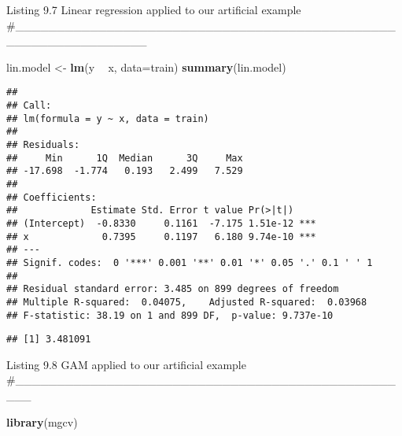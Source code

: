 \documentclass[]{article}
\newenvironment{Shaded}{\begin{snugshade}}{\end{snugshade}}
\newcommand{\CommentTok}[1]{\textcolor[rgb]{0.56,0.35,0.01}{\textit{#1}}}
\newcommand{\DataTypeTok}[1]{\textcolor[rgb]{0.13,0.29,0.53}{#1}}
\newcommand{\DecValTok}[1]{\textcolor[rgb]{0.00,0.00,0.81}{#1}}
\newcommand{\KeywordTok}[1]{\textcolor[rgb]{0.13,0.29,0.53}{\textbf{#1}}}
\newcommand{\NormalTok}[1]{#1}
\newcommand{\OperatorTok}[1]{\textcolor[rgb]{0.81,0.36,0.00}{\textbf{#1}}}
\newcommand{\StringTok}[1]{\textcolor[rgb]{0.31,0.60,0.02}{#1}}
\begin{document}
Listing 9.7 Linear regression applied to our artificial example
\#\_\_\_\_\_\_\_\_\_\_\_\_\_\_\_\_\_\_\_\_\_\_\_\_\_\_\_\_\_\_\_\_\_\_\_\_\_\_\_\_\_\_\_\_\_\_\_\_\_\_\_\_\_\_\_\_\_\_\_\_\_\_\_

\begin{Shaded}
\begin{Highlighting}[]
\NormalTok{lin.model <-}\StringTok{ }\KeywordTok{lm}\NormalTok{(y }\OperatorTok{~}\StringTok{ }\NormalTok{x, }\DataTypeTok{data=}\NormalTok{train)}
\KeywordTok{summary}\NormalTok{(lin.model)}
\end{Highlighting}
\end{Shaded}

\begin{verbatim}
## 
## Call:
## lm(formula = y ~ x, data = train)
## 
## Residuals:
##     Min      1Q  Median      3Q     Max 
## -17.698  -1.774   0.193   2.499   7.529 
## 
## Coefficients:
##             Estimate Std. Error t value Pr(>|t|)    
## (Intercept)  -0.8330     0.1161  -7.175 1.51e-12 ***
## x             0.7395     0.1197   6.180 9.74e-10 ***
## ---
## Signif. codes:  0 '***' 0.001 '**' 0.01 '*' 0.05 '.' 0.1 ' ' 1
## 
## Residual standard error: 3.485 on 899 degrees of freedom
## Multiple R-squared:  0.04075,    Adjusted R-squared:  0.03968 
## F-statistic: 38.19 on 1 and 899 DF,  p-value: 9.737e-10
\end{verbatim}

\begin{Shaded}
\end{Shaded}

\begin{verbatim}
## [1] 3.481091
\end{verbatim}

Listing 9.8 GAM applied to our artificial example
\#\_\_\_\_\_\_\_\_\_\_\_\_\_\_\_\_\_\_\_\_\_\_\_\_\_\_\_\_\_\_\_\_\_\_\_\_\_\_\_\_\_\_\_\_\_\_\_\_\_

\begin{Shaded}
\begin{Highlighting}[]
\KeywordTok{library}\NormalTok{(mgcv)}
\end{Highlighting}
\end{Shaded}
\end{document}
